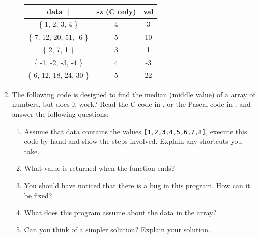 \begin{enumerate}
\begin{enumerate}
    \begin{table}[h]
      \centering
      \begin{tabular}{|c|c|c|}
      \hline
       \textbf{data[ ]} & \textbf{sz} (C only)  & \textbf{val}  \\
       \hline 
       \{ 1, 2, 3, 4 \} & 4 & 3 \\
       \hline
       \{ 7, 12, 20, 51, -6 \} & 5 & 10 \\
       \hline
       \{ 2, 7, 1 \} & 3 & 1 \\
       \hline
       \{ -1, -2, -3, -4 \} & 4 & -3 \\
       \hline
       \{ 6, 12, 18, 24, 30 \} & 5 & 22 \\
       \hline
      \end{tabular}
    \end{table}
    
      \end{enumerate}
  \begin{figure}[h]
  \end{figure}
  \begin{figure}[h]
  \end{figure}
  
  \clearpage
  \item The following code is designed to find the median (middle value) of a array of numbers, but does it work? Read the C code in , or the Pascal code in , and answer the following questions:
  \begin{enumerate}
    \item Assume that data contains the values \texttt{[1,2,3,4,5,6,7,8]}, execute this code by hand and show the steps involved. Explain any shortcuts you take.
    \item What value is returned when the function ends?
    \item You should have noticed that there is a bug in this program. How can it be fixed?
    \item What does this program assume about the data in the array?
    \item Can you think of a simpler solution? Explain your solution.
  \end{enumerate}
  \begin{figure}[h]
  \end{figure}
  \begin{figure}[h]
  \end{figure}


\end{enumerate}
